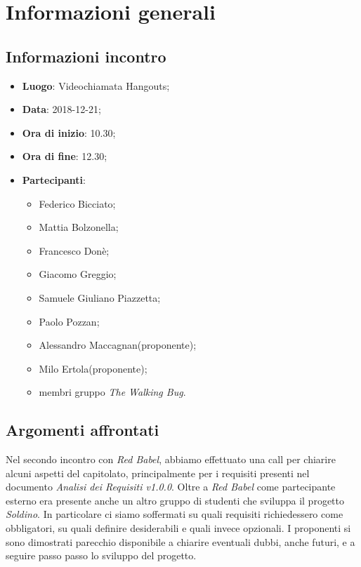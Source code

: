 \section{Informazioni generali}

\subsection{Informazioni incontro}
\begin{itemize}
\item \textbf{Luogo}: Videochiamata Hangouts;
\item \textbf{Data}: 2018-12-21;
\item \textbf{Ora di inizio}: 10.30;
\item \textbf{Ora di fine}: 12.30;
\item \textbf{Partecipanti}:
\begin{itemize}
	\item Federico Bicciato;
	\item Mattia Bolzonella;
	\item Francesco Donè;
	\item Giacomo Greggio;
	\item Samuele Giuliano Piazzetta;
	\item Paolo Pozzan;
	\item Alessandro Maccagnan(proponente);
	\item Milo Ertola(proponente);
	\item membri gruppo \textit{The Walking Bug}.
\end{itemize}
\end{itemize}

\subsection{Argomenti affrontati}
Nel secondo incontro con \textit{Red Babel}, abbiamo effettuato una call per 
chiarire alcuni aspetti del capitolato, principalmente per i requisiti presenti
nel documento \textit{Analisi dei Requisiti v1.0.0}.
Oltre a \textit{Red Babel} come partecipante esterno era presente anche un altro
gruppo di studenti che sviluppa il progetto \textit{Soldino}.
In particolare ci siamo soffermati su quali requisiti richiedessero come obbligatori,
su quali definire desiderabili e quali invece opzionali.\newline
I proponenti si sono dimostrati parecchio disponibile a chiarire eventuali dubbi,
anche futuri, e a seguire passo passo lo sviluppo del progetto.
